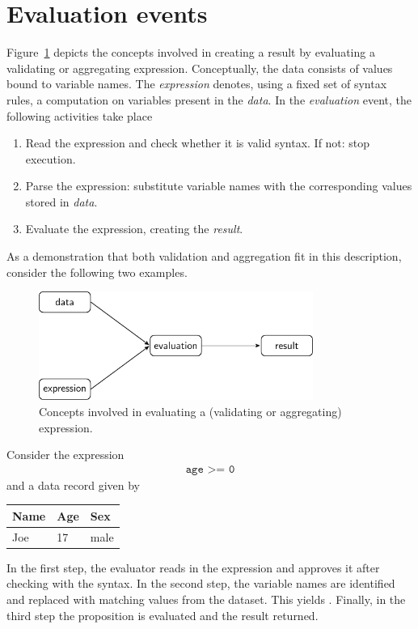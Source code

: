 \section{Evaluation events}
\label{evaluations}
Figure~\ref{fig:eval} depicts the concepts involved in creating a result by
evaluating a validating or aggregating expression. Conceptually, the \textsf{data}
consists of values bound to variable names. The \emph{expression} denotes, using
a fixed set of syntax rules, a computation on variables present in the \emph{data}.
In the \emph{evaluation} event, the following activities take place
\begin{enumerate}[noitemsep]
\item Read the expression and check whether it is valid syntax. If not: stop execution.
\item Parse the expression: substitute variable names with the corresponding values
stored in \emph{data}.
\item Evaluate the expression, creating the \emph{result}.
\end{enumerate}
As a demonstration that both validation and aggregation fit in this description,
consider the following two examples.
%
\begin{figure}
\centering
\includegraphics[width=0.8\textwidth]{fig/eval.pdf}
\caption{Concepts involved in evaluating a (validating or aggregating) expression.}
\label{fig:eval}
\end{figure}

\begin{example}
Consider the expression
\begin{align*}
\texttt{age >= 0}
\end{align*}
and a data record given by
\begin{center}
\begin{tabular}{lll}
Name & Age & Sex \\
\hline
Joe  & 17  & male
\end{tabular}
\end{center}
In the first step, the evaluator reads in the expression and approves it after
checking with the syntax. In the second step, the variable names are identified
and replaced with matching values from the dataset. This yields .
Finally, in the third step the proposition  is evaluated and the
result returned.
\end{example}

